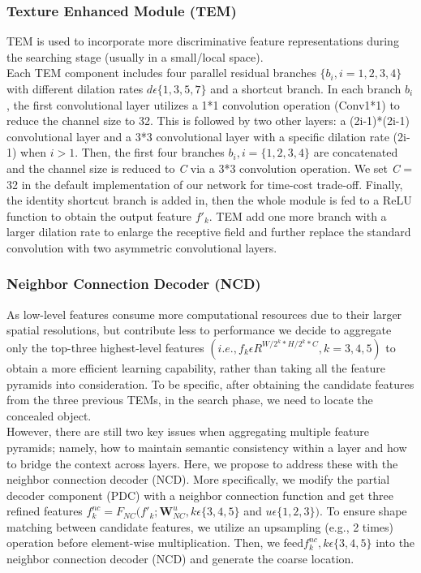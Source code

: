 \begin{multicols}{2}
\subsubsection{{{\fontsize{13}{17}\selectfont \textbf{Texture Enhanced Module (TEM)}}}}\cite{tem}
TEM is used to incorporate more discriminative feature representations during the searching stage (usually in a small/local space).\\
Each TEM component includes four parallel residual branches \(\{b_i, i = 1, 2, 3, 4\}\) with different dilation rates \(d\epsilon \{1, 3, 5, 7\}\) and a shortcut
branch. In each branch \(b_i\), the first convolutional layer utilizes a 1*1 convolution operation (Conv1*1) to reduce the channel size to 32. This is followed by two other layers: a (2i-1)*(2i-1) convolutional layer and a 3*3 convolutional layer with a specific dilation rate (2i-1) when \(i > 1\). Then, the first four branches \(b_i, i = \{1, 2, 3, 4\}\) are concatenated and the channel size is reduced to \textit{C} via a 3*3 convolution operation. We set \textit{C} = 32 in the default implementation of our network for time-cost trade-off. Finally, the identity shortcut branch is added in, then the whole module is fed to a ReLU function to obtain the output feature \(f'_k\). TEM add one more branch with a larger dilation rate to enlarge the receptive field and further replace the standard convolution with two asymmetric convolutional layers.
\vspace{0.5cm}
\subsubsection{{{\fontsize{13}{17}\selectfont \textbf{Neighbor Connection Decoder (NCD)}}}}\cite{book}
As low-level features consume more computational resources due to their larger spatial resolutions, but contribute less to performance we decide to aggregate only the top-three highest-level features \((i.e., f_k\epsilon R^{W/2^k*H/2^k*C}, k = 3, 4, 5)\) to obtain a more efficient learning capability, rather than taking all the feature pyramids into consideration. To be specific, after obtaining the candidate features from the three previous TEMs, in the search phase, we need to locate the concealed object.\\
However, there are still two key issues when aggregating multiple feature pyramids; namely, how to maintain semantic consistency within a layer and how to bridge the context across layers. Here, we propose to address these with the neighbor connection decoder (NCD). More specifically, we modify the partial decoder component (PDC) with a neighbor connection function and get three refined features \(f^{nc}_k=F_{NC}(f'_k; \textbf{W}^u_{NC}, k\epsilon \{3,4,5\}\) and \(u \epsilon \{1,2,3\})\). To ensure shape matching between candidate features, we utilize an upsampling (e.g., 2 times) operation before element-wise multiplication. Then, we feed\(f^{nc}_k, k\epsilon \{3,4,5\}\) into the neighbor
connection decoder (NCD) and generate the coarse location.
\vspace{0.5cm}

\end{multicols}
